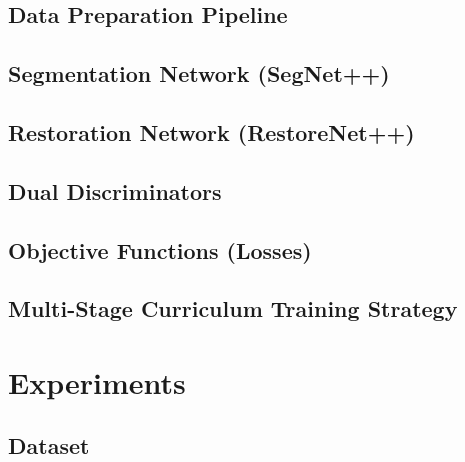\documentclass{ipgpmaster}
\begin{document}
\subsection{Data Preparation Pipeline}

\subsection{Segmentation Network (SegNet++)}

\subsection{Restoration Network (RestoreNet++)}

\subsection{Dual Discriminators}

\subsection{Objective Functions (Losses)}

\subsection{Multi-Stage Curriculum Training Strategy}


\newpage
\section{Experiments}

\subsection{Dataset}
\end{document}
